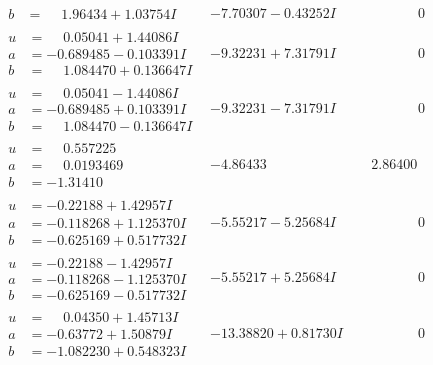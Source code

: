 \documentclass[1p]{elsarticle_modified}
\theoremstyle{definition}
\begin{document}
$$\begin{array}{c|c|c}
\begin{aligned}
b &= \phantom{-}1.96434 + 1.03754 I\end{aligned}
 & -7.70307 - 0.43252 I & \phantom{-0.000000 } 0 \\ \hline\begin{aligned}
u &= \phantom{-}0.05041 + 1.44086 I \\
a &= -0.689485 - 0.103391 I \\
b &= \phantom{-}1.084470 + 0.136647 I\end{aligned}
 & -9.32231 + 7.31791 I & \phantom{-0.000000 } 0 \\ \hline\begin{aligned}
u &= \phantom{-}0.05041 - 1.44086 I \\
a &= -0.689485 + 0.103391 I \\
b &= \phantom{-}1.084470 - 0.136647 I\end{aligned}
 & -9.32231 - 7.31791 I & \phantom{-0.000000 } 0 \\ \hline\begin{aligned}
u &= \phantom{-}0.557225\phantom{ +0.000000I} \\
a &= \phantom{-}0.0193469\phantom{ +0.000000I} \\
b &= -1.31410\phantom{ +0.000000I}\end{aligned}
 & -4.86433\phantom{ +0.000000I} & \phantom{-}2.86400\phantom{ +0.000000I} \\ \hline\begin{aligned}
u &= -0.22188 + 1.42957 I \\
a &= -0.118268 + 1.125370 I \\
b &= -0.625169 + 0.517732 I\end{aligned}
 & -5.55217 - 5.25684 I & \phantom{-0.000000 } 0 \\ \hline\begin{aligned}
u &= -0.22188 - 1.42957 I \\
a &= -0.118268 - 1.125370 I \\
b &= -0.625169 - 0.517732 I\end{aligned}
 & -5.55217 + 5.25684 I & \phantom{-0.000000 } 0 \\ \hline\begin{aligned}
u &= \phantom{-}0.04350 + 1.45713 I \\
a &= -0.63772 + 1.50879 I \\
b &= -1.082230 + 0.548323 I\end{aligned}
 & -13.38820 + 0.81730 I & \phantom{-0.000000 } 0 \\ \hline\begin{aligned}

\end{aligned}
\end{array}$$
\end{document}
